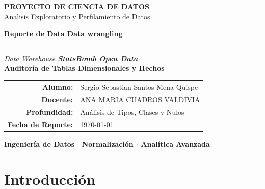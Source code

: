 \documentclass[12pt,a4paper]{article}
\begin{document}
\begin{center}

{\large\color{white}\textbf{PROYECTO DE CIENCIA DE DATOS}}\\[0.4em]
{\normalsize\color{white!70!primary}Analisis Exploratorio y Perfilamiento de Datos}

\vspace{2.5cm}

{\fontsize{30}{36}\selectfont\bfseries\color{primary} Reporte de Data Data wrangling}

\vspace{0.5em}
\textcolor{secondary}{\rule{10cm}{2pt}}
\vspace{0.4em}

{\Large\color{darkgray}\textit{Data Warehouse \textbf{StatsBomb Open Data}}}\\[0.2em]
{\large\color{secondary}\textbf{Auditoría de Tablas Dimensionales y Hechos}}

\vspace{2.5cm}

\begin{tcolorbox}[
  width=15cm,
  colback=lightgray,
  colframe=primary,
  boxrule=1.2pt,
  arc=6pt,
  left=12pt, right=12pt, top=10pt, bottom=10pt
]
\centering
\begin{tabular}{@{}rl@{}}
  \color{darkgray}\textbf{Alumno:}             & \color{primary} Sergio Sebastian Santos Mena Quispe \\[5pt]
  \color{darkgray}\textbf{Docente:}              & \color{primary}ANA MARIA CUADROS VALDIVIA\\[5pt]
  \color{darkgray}\textbf{Profundidad:}         & \color{primary} Análisis de Tipos, Clases y Nulos \\[5pt]
  \color{darkgray}\textbf{Fecha de Reporte:}    & \color{primary} \today \\
\end{tabular}
\end{tcolorbox}

\vspace{3cm}

{\normalsize\color{white}\textbf{Ingeniería de Datos $\cdot$ Normalización $\cdot$ Analítica Avanzada}}

\end{center}

\newpage
\tableofcontents
\newpage

\section{Introducción}
\end{document}
